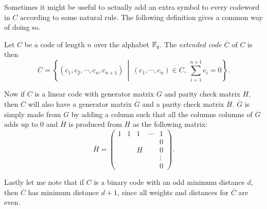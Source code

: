 Sometimes it might be useful to actually add an extra symbol to every codeword in $C$ according to some natural rule. The following definition gives a common way of doing so.
\begin{defi}
\label{def:extCode}
	Let $C$ be a code of length $n$ over the alphabet $\mathbb{F}_q$. The \emph{extended code $\overline{C}$} of $C$ is then
	\[
		\overline{C} = \left\{ \left(c_1 , c_2 , \cdots , c_n , c_{n+1} \right) \ \middle\vert \ \left(c_1 , \cdots , c_n \right) \in C, \ \sum_{i = 1}^{n +1} c_i = 0 \right\}.
	\]
\end{defi}

Now if $C$ is a linear code with generator matrix $G$ and parity check matrix $H$, then $\overline{C}$ will also have a generator matrix $\overline{G}$ and a parity check matrix $\overline{H}$. $\overline{G}$ is simply made from $G$ by adding a column such that all the columns columns of $\overline{G}$ adds up to $0$ and $\overline{H}$ is produced from $H$ as the following matrix:
\[
	\overline{H} = \begin{pmatrix}
		1 & 1 & 1 & \cdots & 1\\
		& & & & 0\\
		& & H & & 0\\
		& & & & \vdots \\
		& & & & 0
	\end{pmatrix}.
\]

Lastly let me note that if $C$ is a binary code with an odd minimum distance $d$, then $\overline{C}$ has minimum distance $d+1$, since all weights and distances for $\overline{C}$ are even.